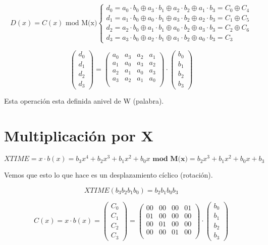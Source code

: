  
 
 $$D(x) = C(x) \text{ mod M(x)} \begin{cases}
 d_0 = a_0\cdot b_0 \oplus a_3 \cdot b_1 \oplus a_2 \cdot b_2 \oplus a_1 \cdot b_3 = C_0 \oplus C_4\\
 d_1 = a_1\cdot b_0 \oplus a_0 \cdot b_1 \oplus a_3 \cdot b_2 \oplus a_2 \cdot b_3 = C_1 \oplus C_5\\
 d_2 = a_2\cdot b_0 \oplus a_1 \cdot b_1 \oplus a_0 \cdot b_2 \oplus a_3 \cdot b_3 = C_2 \oplus C_6\\
 d_3 = a_3\cdot b_0 \oplus a_2 \cdot b_1 \oplus a_1 \cdot b_2 \oplus a_0 \cdot b_3 = C_3
 \end{cases}$$
 
 $$\left(\begin{matrix}
 d_0\\d_1\\d_2\\d_3
 \end{matrix} \right) = \left(\begin{matrix}
 a_0 & a_3 & a_2 & a_1\\
 a_1 & a_0 & a_3 & a_2\\
 a_2 & a_1 & a_0 & a_3\\
 a_3 & a_2 & a_1 & a_0\\
 \end{matrix}\right) \cdot \left( \begin{matrix}
 b_0\\
 b_1\\
 b_2\\
 b_3
 \end{matrix}\right)$$
 
 Esta operación esta definida  anivel de W (palabra).
 
 \section{Multiplicación por X}
 
 $$XTIME = x \cdot b(x) = b_3x^4 + b_2 x^3 + b_1 x^2 + b_0 x \textbf{ mod M(x)} = b_2x^3 +b_1x^2 + b_0x + b_3$$
 
 Vemos que esto lo que hace es un desplazamiento cíclico (rotación).
 
 $$XTIME(b_3 b_2 b_1 b_0) = b_2 b_1 b_0 b_3$$
 
 
 $$C(x) = x \cdot b(x) = \left(\begin{matrix}
 	C_0\\C_1\\C_2\\C_3
 \end{matrix} \right) = \left(\begin{matrix}
 00 & 00 & 00 & 01\\
 01 & 00 & 00 & 00\\
 00 & 01 & 00 & 00\\
 00 & 00 & 01 & 00\\
\end{matrix}\right) \cdot \left( \begin{matrix}
b_0\\
b_1\\
b_2\\
b_3
\end{matrix}\right)$$
 
